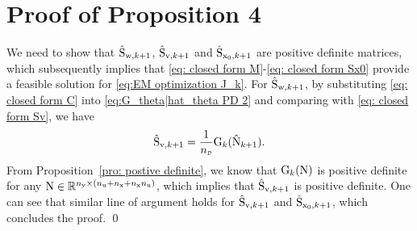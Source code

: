 \section{Proof of Proposition 4}\label{app:recursive feaisbility}
We need to show that $\hat{{ \mathrm{S} }}_{{ \mathrm{w} },k+1}$, $\hat{{ \mathrm{S} }}_{{ \mathrm{v} },k+1}$ and $\hat{{ \mathrm{S} }}_{{ \mathrm{x} }_0,k+1}$ are positive definite matrices, which subsequently implies that \eqref{eq: closed form M}-\eqref{eq: closed form Sx0} provide a feasible solution for \eqref{eq:EM optimization J_k}. 
For $\hat{{ \mathrm{S} }}_{{ \mathrm{w} },k+1}$, by substituting \eqref{eq: closed form C} into \eqref{eq:G_theta|hat_theta PD 2} and comparing with \eqref{eq: closed form Sv}, we have
    \begin{equation}
       \hat{\mxS}_{\vcv,k+1} = \frac{1}{\nD}\mxG_k(\hat{\mxN}_{k+1}).
    \end{equation}
From Proposition~\ref{pro: postive definite}, we know that ${ \mathrm{G} }_k({ \mathrm{N} })$ is positive definite for any ${ \mathrm{N} } \in {\mathbb{R}}^{n_{ \mathrm{y} } \times (n_{ \mathrm{u} } + n_{ \mathrm{x} } + n_{ \mathrm{x} }n_{ \mathrm{u} })}$, which implies that $\hat{{ \mathrm{S} }}_{{ \mathrm{v} },k+1}$ is positive definite.
One can see that similar line of argument holds for $\hat{{ \mathrm{S} }}_{{ \mathrm{v} },k+1}$ and $\hat{{ \mathrm{S} }}_{{ \mathrm{x} }_0,k+1}$, 
which concludes the proof.
\qed


